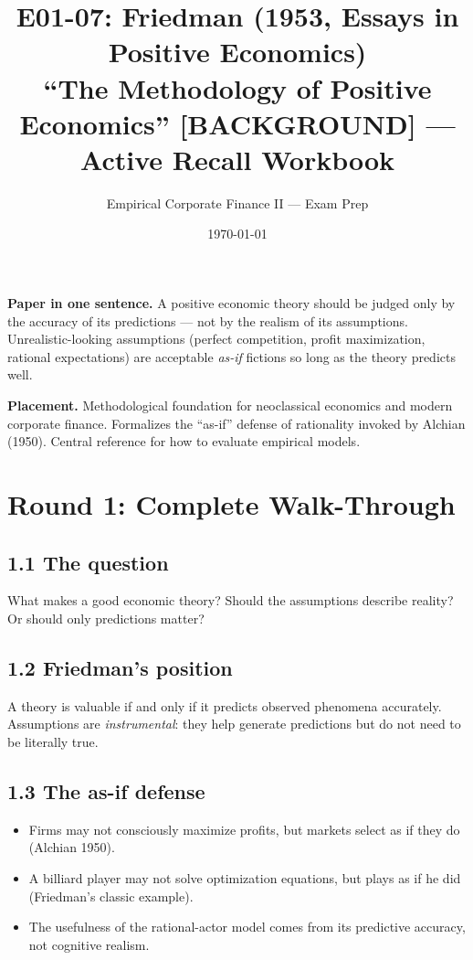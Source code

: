 \documentclass[11pt]{article}
\title{E01-07: Friedman (1953, Essays in Positive Economics) \\
\large ``The Methodology of Positive Economics'' [BACKGROUND] --- Active Recall Workbook}
\author{Empirical Corporate Finance II --- Exam Prep}
\date{\today}
\begin{document}
\maketitle

\begin{keybox}
\textbf{Paper in one sentence.} A positive economic theory should be judged only by the accuracy of its predictions --- not by the realism of its assumptions. Unrealistic-looking assumptions (perfect competition, profit maximization, rational expectations) are acceptable \emph{as-if} fictions so long as the theory predicts well.

\textbf{Placement.} Methodological foundation for neoclassical economics and modern corporate finance. Formalizes the ``as-if'' defense of rationality invoked by Alchian (1950). Central reference for how to evaluate empirical models.
\end{keybox}

\section*{Round 1: Complete Walk-Through}

\subsection*{1.1 The question}
What makes a good economic theory? Should the assumptions describe reality? Or should only predictions matter?

\subsection*{1.2 Friedman's position}
A theory is valuable if and only if it predicts observed phenomena accurately. Assumptions are \emph{instrumental}: they help generate predictions but do not need to be literally true.

\subsection*{1.3 The as-if defense}
\begin{itemize}
\item Firms may not consciously maximize profits, but markets select as if they do (Alchian 1950).
\item A billiard player may not solve optimization equations, but plays as if he did (Friedman's classic example).
\item The usefulness of the rational-actor model comes from its predictive accuracy, not cognitive realism.
\end{itemize}
\end{document}
